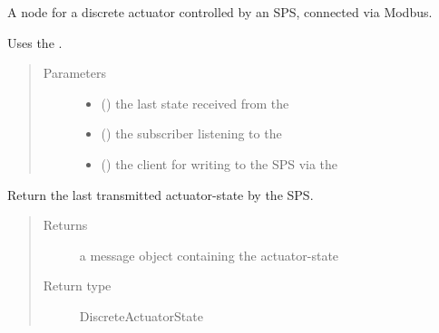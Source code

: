 \documentclass[a4paper,12pt,twoside]{article}
\begin{document}
\begin{fulllineitems}
\label{\detokenize{meso_control_pkg:meso_control_pkg.sps_discrete_actuator_node.SpsDiscreteActuator}}
A node for a discrete actuator controlled by an SPS, connected via Modbus.

Uses the .
\begin{quote}\begin{description}
\item[{Parameters}] \leavevmode\begin{itemize}
\item {} 
 () \textendash{} the last state received from the 

\item {} 
 () \textendash{} the subscriber listening to the 

\item {} 
 () \textendash{} the client for writing to the SPS via the 

\end{itemize}

\end{description}\end{quote}

\begin{fulllineitems}
\label{\detokenize{meso_control_pkg:meso_control_pkg.sps_discrete_actuator_node.SpsDiscreteActuator.poll_status}}
Return the last transmitted actuator-state by the SPS.
\begin{quote}\begin{description}
\item[{Returns}] \leavevmode
a message object containing the actuator-state

\item[{Return type}] \leavevmode
DiscreteActuatorState


\end{description}
\end{quote}
\end{fulllineitems}
\end{fulllineitems}
\end{document}
